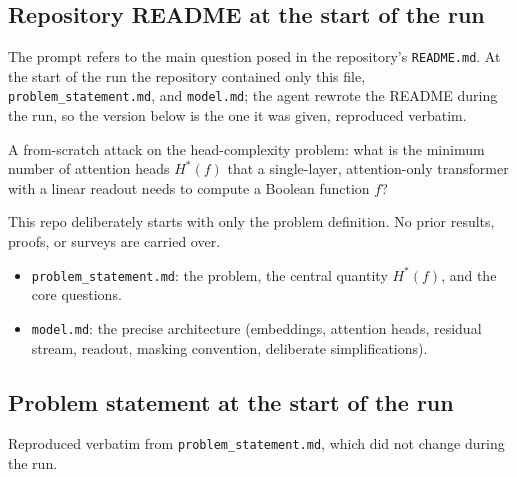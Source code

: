 \documentclass{article}
\theoremstyle{definition}
\theoremstyle{plain}
\begin{document}
\begin{sourcebox}
\begin{itemize}[leftmargin=*,nosep]
\end{itemize}
\end{sourcebox}

\subsection{Repository README at the start of the run}
\label{app:readme}

The prompt refers to the main question posed in the repository's \texttt{README.md}. At the start of the run the repository contained only this file, \texttt{problem\_statement.md}, and \texttt{model.md}; the agent rewrote the README during the run, so the version below is the one it was given, reproduced verbatim.

\begin{sourcebox}

  A from-scratch attack on the head-complexity problem: what is the minimum number of attention heads $H^{\ast}(f)$ that a single-layer, attention-only transformer with a linear readout needs to compute a Boolean function $f$?

This repo deliberately starts with only the problem definition. No prior results, proofs, or surveys are carried over.
\begin{itemize}[leftmargin=*,nosep]
  \item \texttt{problem\_statement.md}: the problem, the central quantity $H^{\ast}(f)$, and the core questions.
  \item \texttt{model.md}: the precise architecture (embeddings, attention heads, residual stream, readout, masking convention, deliberate simplifications).
\end{itemize}
\end{sourcebox}

\subsection{Problem statement at the start of the run}
\label{app:problem-statement}

Reproduced verbatim from \texttt{problem\_statement.md}, which did not change during the run.
\end{document}
